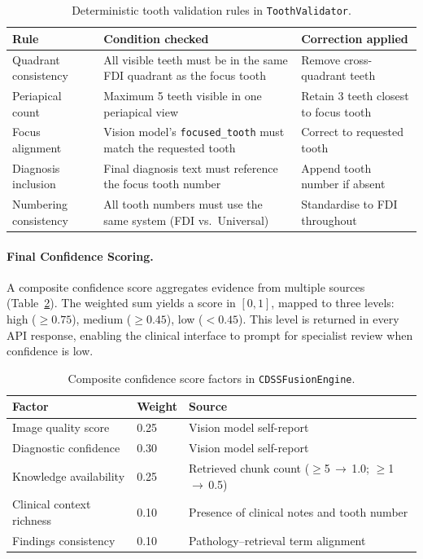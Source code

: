 \documentclass[12pt,a4paper]{report}
\begin{document}
	\begin{table}[H]
		\centering
		\caption{Deterministic tooth validation rules in \texttt{ToothValidator}.}
		\label{tab:tooth_validator}
		{\small
			\begin{tabular}{p{3.0cm}p{5.0cm}p{3.8cm}}
				\toprule
				\textbf{Rule} & \textbf{Condition checked} & \textbf{Correction applied} \\
				\midrule
				Quadrant consistency
				& All visible teeth must be in the same FDI quadrant as the focus tooth
				& Remove cross-quadrant teeth \\[3pt]
				Periapical count
				& Maximum 5 teeth visible in one periapical view
				& Retain 3 teeth closest to focus tooth \\[3pt]
				Focus alignment
				& Vision model's \texttt{focused\_tooth} must match the requested tooth
				& Correct to requested tooth \\[3pt]
				Diagnosis inclusion
				& Final diagnosis text must reference the focus tooth number
				& Append tooth number if absent \\[3pt]
				Numbering consistency
				& All tooth numbers must use the same system (FDI vs.\ Universal)
				& Standardise to FDI throughout \\
				\bottomrule
			\end{tabular}
		}
	\end{table}
	
	\paragraph{Final Confidence Scoring.}
	A composite confidence score aggregates evidence from multiple sources
	(Table~\ref{tab:confidence}). The weighted sum yields a score in $[0,1]$, mapped to three
	levels: high ($\geq 0.75$), medium ($\geq 0.45$), low ($< 0.45$). This level is returned
	in every API response, enabling the clinical interface to prompt for specialist review when
	confidence is low.
	
	
	\begin{table}[H]
		\centering
		\caption{Composite confidence score factors in \texttt{CDSSFusionEngine}.}
		\label{tab:confidence}
		\begin{tabular}{lll}
			\toprule
			\textbf{Factor} & \textbf{Weight} & \textbf{Source} \\
			\midrule
			Image quality score       & 0.25 & Vision model self-report \\
			Diagnostic confidence     & 0.30 & Vision model self-report \\
			Knowledge availability    & 0.25 & Retrieved chunk count ($\geq$5\,$\rightarrow$\,1.0; $\geq$1\,$\rightarrow$\,0.5) \\
			Clinical context richness & 0.10 & Presence of clinical notes and tooth number \\
			Findings consistency      & 0.10 & Pathology--retrieval term alignment \\
			\bottomrule
		\end{tabular}
	\end{table}
	
\end{document}
